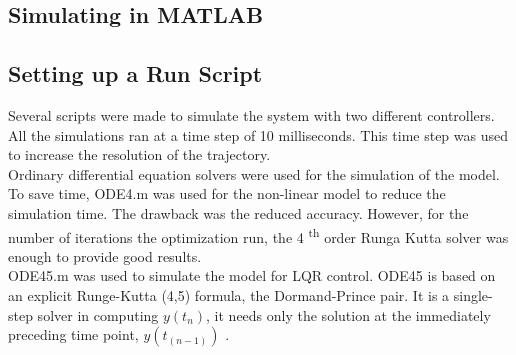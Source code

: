 \documentclass{UoNMCHA}
\numberwithin{equation}{section}
\begin{document}
\begin{table}[H]
	\end{table}
	
	\newpage
	\subsection{Simulating in MATLAB}
	
	\subsection{Setting up a Run Script}
	
	Several scripts were made to simulate the system with two different controllers. All the simulations ran at a time step of 10 milliseconds. This time step was used to increase the resolution of the trajectory. \\
	
	Ordinary differential equation solvers were used for the simulation of the model. To save time, ODE4.m was used for the non-linear model to reduce the simulation time. The drawback was the reduced accuracy. However, for the number of iterations the optimization run, the 4 \textsuperscript{th} order Runga Kutta solver was enough to provide good results. \\
	ODE45.m was used to simulate the model for LQR control. ODE45 is based on an explicit Runge-Kutta (4,5) formula, the Dormand-Prince pair. It is a single-step solver in computing $y(t_n )$, it needs only the solution at the immediately preceding time point, $y(t_{(n-1)} )$ \cite{shampine_1997_the}. \\
\end{document}
